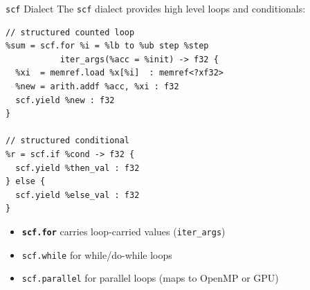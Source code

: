\begin{frame}[fragile]{\texttt{scf} Dialect}
  The \texttt{scf} dialect provides high level loops and conditionals:

\begin{lstlisting}[language=none,basicstyle=\ttfamily\footnotesize]
// structured counted loop
%sum = scf.for %i = %lb to %ub step %step
           iter_args(%acc = %init) -> f32 {
  %xi  = memref.load %x[%i]  : memref<?xf32>
  %new = arith.addf %acc, %xi : f32
  scf.yield %new : f32
}

// structured conditional
%r = scf.if %cond -> f32 {
  scf.yield %then_val : f32
} else {
  scf.yield %else_val : f32
}
\end{lstlisting}

  \begin{itemize}
    \item \textbf{\texttt{scf.for}} carries loop-carried values
          (\texttt{iter\_args})
    \item \texttt{scf.while} for while/do-while loops
    \item \texttt{scf.parallel} for parallel loops (maps to OpenMP or GPU)
  \end{itemize}
\end{frame}


